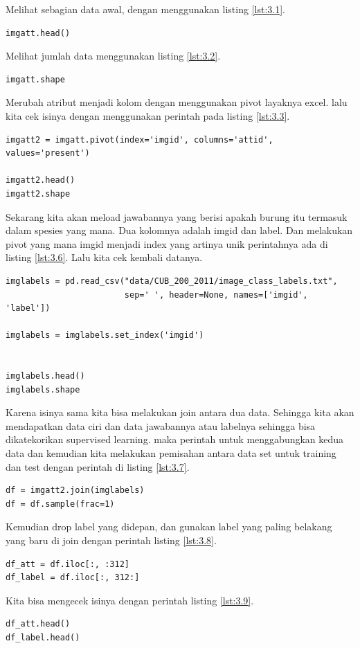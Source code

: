 Melihat sebagian data awal, dengan menggunakan listing \ref{lst:3.1}.

\begin{lstlisting}[caption=Melihat sebagian data awal,label={lst:3.1}]
imgatt.head()
\end{lstlisting}

Melihat jumlah data menggunakan listing \ref{lst:3.2}.
\begin{lstlisting}[caption=Mengetahui jumlah data,label={lst:3.2}]
imgatt.shape
\end{lstlisting}

Merubah atribut menjadi kolom dengan menggunakan pivot layaknya excel. lalu kita cek isinya dengan menggunakan perintah pada listing \ref{lst:3.3}.
\begin{lstlisting}[caption=Pivot dataset,label={lst:3.3}]
imgatt2 = imgatt.pivot(index='imgid', columns='attid', values='present')

imgatt2.head()
imgatt2.shape
\end{lstlisting}


Sekarang kita akan meload jawabannya yang berisi apakah burung itu termasuk dalam spesies yang mana. Dua kolomnya adalah imgid dan label. Dan melakukan pivot yang mana imgid menjadi index yang artinya unik perintahnya ada di listing \ref{lst:3.6}. Lalu kita cek kembali datanya. 
\begin{lstlisting}[caption=membaca dataset label file txt,label={lst:3.6}]
imglabels = pd.read_csv("data/CUB_200_2011/image_class_labels.txt", 
                        sep=' ', header=None, names=['imgid', 'label'])

imglabels = imglabels.set_index('imgid')


imglabels.head()
imglabels.shape
\end{lstlisting}

Karena isinya sama kita bisa melakukan join antara dua data. Sehingga kita akan mendapatkan data ciri dan data jawabannya atau labelnya sehingga bisa dikatekorikan supervised learning. maka perintah untuk menggabungkan kedua data dan kemudian kita melakukan pemisahan antara data set untuk training dan test dengan perintah di listing \ref{lst:3.7}.
\begin{lstlisting}[caption=Menggabungkan field dari dua file terpisah,label={lst:3.7}]
df = imgatt2.join(imglabels)
df = df.sample(frac=1)
\end{lstlisting}

Kemudian drop label yang didepan, dan gunakan label yang paling belakang yang baru di join dengan perintah listing \ref{lst:3.8}.
\begin{lstlisting}[caption=Memisahkan dan memilih label,label={lst:3.8}]
df_att = df.iloc[:, :312]
df_label = df.iloc[:, 312:]
\end{lstlisting}
Kita bisa mengecek isinya dengan perintah listing \ref{lst:3.9}.
\begin{lstlisting}[caption=Melihat isi masing masing data frame,label={lst:3.9}]
df_att.head()
df_label.head()
\end{lstlisting}

